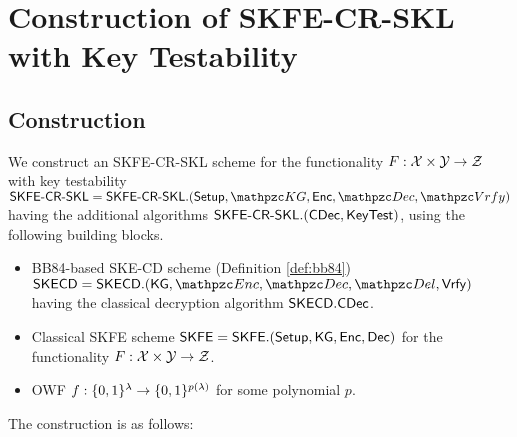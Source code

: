
\section{Construction of SKFE-CR-SKL with Key Testability}\label{sec:SKFESKL-KT}

\subsection{Construction}\label{sec:SKFECRSKL-KT-construction}
We construct an SKFE-CR-SKL scheme for the functionality $F:\mathcal{X}\times\mathcal{Y}\rightarrow\mathcal{Z}$ with key testability $\SKFESKL=
\SKFESKL.(\Setup,\qKG,\Enc,\qDec,\allowbreak\qVrfy)$ having the
additional algorithms $\mathsf{SKFE}\textrm{-}\mathsf{CR}\textrm{-}\mathsf{SKL}.(\mathsf{CDec}, \mathsf{KeyTest})$, using the
following building blocks.

\begin{itemize}
\item BB84-based SKE-CD scheme (Definition \ref{def:bb84}) $\SKECD =
\SKECD.(\KG,\qEnc,\qDec,\allowbreak \qDel,\Vrfy)$ having the classical
decryption algorithm $\mathsf{SKECD}.\mathsf{CDec}$.

\item Classical SKFE scheme $\mathsf{SKFE}=\mathsf{SKFE}.(\mathsf{Setup},\mathsf{KG},\mathsf{Enc},\mathsf{Dec})$ for the functionality $F:\mathcal{X}\times\mathcal{Y}\rightarrow\mathcal{Z}$.

\item OWF $f:\{0,1\}^\lambda\rightarrow\{0,1\}^{p(\lambda)}$ for some polynomial $p$.
\end{itemize}

The construction is as follows:

